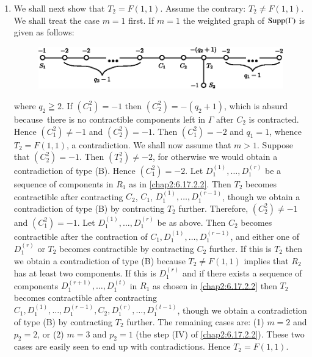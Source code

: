 \begin{enumerate}
\item We shall next show that $T_{2}=F(1,1)$. Assume the contrary:
  $T_{2}\neq F(1,1)$. We shall treat the case $m=1$ first. If $m=1$
  the weighted graph of $\operatorname{Supp}(\Gamma)$ is given as follows:
\begin{figure}[H]
\centering
\includegraphics[scale=.95]{figures/chap2-fig40.eps}
\end{figure}
where $q_{2}\geqq 2$. If $(C^{2}_{1})=-1$ then
$(C^{2}_{2})=-(q_{2}+1)$, which is absurd because\pageoriginale\ there
is no contractible components left in $\Gamma$ after $C_{2}$ is
contracted. Hence $(C^{2}_{1})\neq -1$ and $(C^{2}_{2})=-1$. Then
$(C^{2}_{1})=-2$ and $q_{1}=1$, whence $T_{2}=F(1,1)$, a
contradiction. We shall now assume that $m>1$. Suppose that
$(C^{2}_{2})=-1$. Then $(T^{2}_{2})\neq -2$, for otherwise we would
obtain a contradiction of type (B). Hence $(C^{2}_{1})=-2$. Let
$D^{(1)}_{1},\ldots,D^{(r)}_{1}$ be a sequence of components in
$R_{1}$ as in \ref{chap2:6.17.2.2}. Then $T_{2}$ becomes contractible after
contracting $C_{2}$, $C_{1}$, $D^{(1)}_{1},\ldots,D^{(r-1)}_{1}$,
though we obtain a contradiction of type (B) by contracting $T_{2}$
further. Therefore, $(C^{2}_{2})\neq -1$ and $(C^{2}_{1})=-1$. Let
$D^{(1)}_{1},\ldots,D^{(r)}_{1}$ be as above. Then $C_{2}$ becomes
contractible after the contraction of
$C_{1},D^{(1)}_{1},\ldots,D^{(r-1)}_{1}$, and either one of
$D^{(r)}_{1}$ or $T_{2}$ becomes contractible by contracting $C_{2}$
further. If this is $T_{2}$ then we obtain a contradiction of type (B)
because $T_{2}\neq F(1,1)$ implies that $R_{2}$ has at least two
components. If this is $D^{(r)}_{1}$ and if there exists a sequence of
components $D^{(r+1)}_{1},\ldots,D^{(t)}_{1}$ in $R_{1}$ as chosen in
\ref{chap2:6.17.2.2} then $T_{2}$ becomes contractible after contracting
$C_{1},D^{(1)}_{1},\ldots,D^{(r-1)}_{1},C_{2},D^{(r)}_{1},\ldots,D_{1}^{(t-1)}$,
though we obtain a contradiction of type (B) by contracting $T_{2}$
further. The remaining cases are: (1) $m=2$ and $p_{2}=2$, or (2)
$m=3$ and $p_{2}=1$ (\cf the step (IV) of \ref{chap2:6.17.2.2}). These two
cases are easily seen to end up with contradictions. Hence $T_{2}=F(1,1)$.
\end{enumerate}


